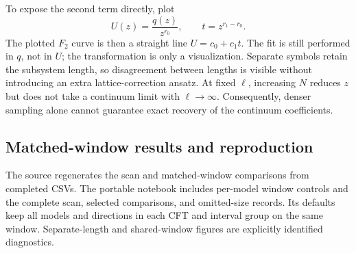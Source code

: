 To expose the second term directly, plot
\begin{equation}
 U(z)=\frac{q(z)}{z^{r_0}},\qquad t=z^{r_1-r_0}.
 \label{eq:dense-normalized-curve}
\end{equation}
The plotted $F_2$ curve is then a straight line $U=c_0+c_1t$.
The fit is still performed in $q$, not in $U$; the transformation is
only a visualization. Separate symbols retain the subsystem length,
so disagreement between lengths is visible without introducing an
extra lattice-correction ansatz. At fixed $\ell$, increasing $N$
reduces $z$ but does not take a continuum limit with $\ell\to\infty$.
Consequently, denser sampling alone cannot guarantee exact recovery
of the continuum coefficients.


\subsection{Matched-window results and reproduction}
The source  regenerates
the scan and matched-window comparisons from completed CSVs.
The portable  notebook includes per-model window
controls and the complete scan, selected comparisons, and omitted-size
records. Its defaults keep all models and directions in each CFT and
interval group on the same window. Separate-length and shared-window
figures are explicitly identified diagnostics.
\begingroup\footnotesize









\endgroup


